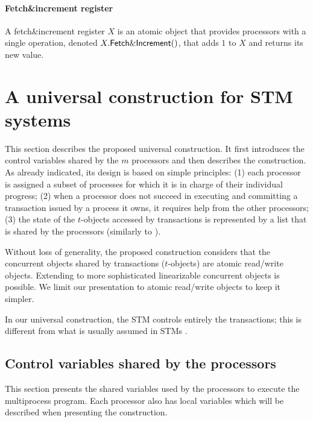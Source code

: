 \paragraph{Fetch\&increment register}
A fetch\&increment register  $X$ is an atomic object that provides 
processors with a  single  operation,
denoted  $X.{\sf Fetch\&Increment}()$, that  adds $1$ to $X$ and 
returns its new value. 


\section{A universal  construction for STM systems}
\label{sec:construction} 

This section describes the proposed universal construction. 
It first introduces  the control variables shared by the $m$ processors
and then describes the  construction. As already indicated, its 
design is based on simple principles: 
(1) each processor is assigned a subset of processes for which 
it is in charge  of  their individual progress; 
(2) when  a  processor does not succeed in executing and committing  
a transaction issued by a process it owns,  it requires help from the other
processors;  
(3) the state of the $t$-objects accessed by transactions is represented 
by a list that is shared by the processors (similarly to \cite{H91}). 



Without loss of generality, the proposed construction considers that 
the  concurrent objects  shared  by transactions ($t$-objects) are  atomic
read/write objects. Extending to more sophisticated linearizable 
concurrent objects is possible. We limit our presentation to atomic
read/write objects to keep it  simpler. 


In our universal construction, the STM controls entirely the transactions; this is different from 
what is usually assumed in STMs \cite{GK10}.



\subsection{Control variables shared  by the  processors}

This section  presents  the shared  variables used by  
the processors to execute the multiprocess program. 
Each processor also has local variables which will be described when presenting 
the  construction.   

